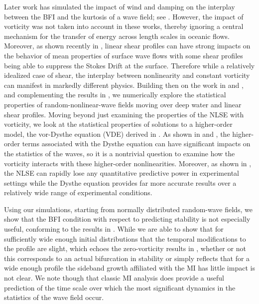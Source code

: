 \documentclass[a4paper,11pt]{article}
\begin{document}
Later work has simulated the impact of wind and damping on the interplay between the BFI and the kurtosis of a wave field; see \cite{slunyaev,eeltink}.  However, the impact of vorticity was not taken into account in these works, thereby ignoring a central mechanism for the transfer of energy across length scales in oceanic flows.  Moreover, as shown recently in \cite{curtis8}, linear shear profiles can have strong impacts on the behavior of mean properties of surface wave flows with some shear profiles being able to suppress the Stokes Drift at the surface.  Therefore while a relatively idealized case of shear, the interplay between nonlinearity and constant vorticity can manifest in markedly different physics.  Building then on the work in \cite{thomas2012nonlinear} and \cite{curtis8}, and complementing the results in \cite{touboul}, we numerically explore the statistical properties of random-nonlinear-wave fields moving over deep water and linear shear profiles.  Moving beyond just examining the properties of the NLSE with vorticity, we look at the statistical properties of solutions to a higher-order model, the vor-Dysthe equation (VDE) derived in \cite{curtis8}.  As shown in \cite{onorato,janssen} and \cite{eeltink}, the higher-order terms associated with the Dysthe equation can have significant impacts on the statistics of the waves, so it is a nontrivial question to examine how the vorticity interacts with these higher-order nonlinearities.  Moreover, as shown in \cite{sergeeva2}, the NLSE can rapidly lose any quantitative predictive power in experimental settings while the Dysthe equation provides far more accurate results over a relatively wide range of experimental conditions.  

Using our simulations, starting from normally distributed random-wave fields, we show that the BFI condition with respect to predicting stability is not especially useful, conforming to the results in \cite{janssen}.  While we are able to show that for sufficiently wide enough initial distributions that the temporal modifications to the profile are slight, which echoes the zero-vorticity results in \cite{sergeeva1,sergeeva2,sergeeva3}, whether or not this corresponds to an actual bifurcation in stability or simply reflects that for a wide enough profile the sideband growth affiliated with the MI has little impact is not clear.  We note though that classic MI analysis does provide a useful prediction of the time scale over which the most significant dynamics in the statistics of the wave field occur.  
\end{document}
